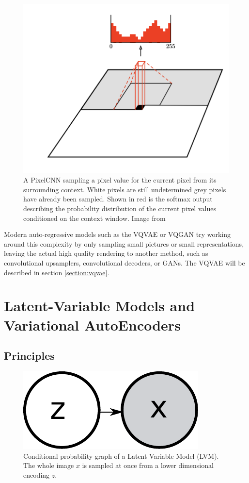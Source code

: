 \begin{figure}[ht]
    \centering
    \includegraphics[scale=0.8]{60-files/pixelcnn.png}
    \caption{A PixelCNN sampling a pixel value for the current pixel from its surrounding context. White pixels are still undetermined grey pixels have already been sampled. Shown in red is the softmax output describing the probability distribution of the current pixel values conditioned on the context window. Image from \citet{pixelcnn}}
    \label{fig:pixelcnn}
\end{figure}

Modern auto-regressive models such as the \ac{VQVAE} \citep{vqvae} or \ac{VQGAN} \citep{vqgan} try working around this complexity by only sampling small pictures or small representations, leaving the actual high quality rendering to another method, such as convolutional upsamplers, convolutional decoders, or \acp{GAN}. The \ac{VQVAE} will be described in section \ref{section:vqvae}.

\section{Latent-Variable Models and Variational AutoEncoders}
\label{sec:vae}
\subsection{Principles}

\begin{figure}[ht]
    \centering
    \includegraphics[scale=0.5]{60-files/chain-vae.pdf}
    \caption{Conditional probability graph of a Latent Variable Model (LVM). The whole image $x$ is sampled at once from a lower dimensional encoding $z$.}
    \label{fig:vae-chain}
\end{figure}

